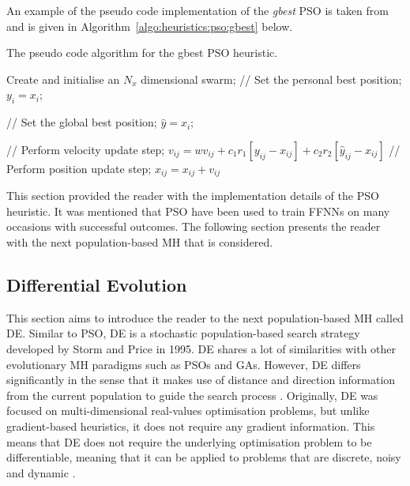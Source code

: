 An example of the pseudo code implementation of the \textit{gbest} \ac{PSO} is taken from \cite{ref:engelbrecht:2007} and is given in Algorithm~\ref{algo:heuristics:pso:gbest} below.

\begin{algorithm}[H]
      \caption{The pseudo code algorithm for the gbest \ac{PSO} heuristic.}
      \label{algo:heuristics:pso:gbest}
      \begin{algorithmic}
            \State Create and initialise an $N_{x}$ dimensional swarm;
            \State // Set the personal best position;
            \State $y_{i} = x_{i}$;
            \EndIf

            \State // Set the global best position;
            \State $\hat{y} = x_{i}$;
            \EndIf
            \EndFor

            \State // Perform velocity update step;
            \State $v_{ij} = wv_{ij} + c_{1}r_{1}[y_{ij} - x_{ij}] + c_{2}r_{2}[\hat{y}_{ij} - x_{ij}]$
            \State // Perform position update step;
            \State $x_{ij} = x_{ij} + v_{ij}$
            \EndFor
            \EndWhile
      \end{algorithmic}
\end{algorithm}

This section provided the reader with the implementation details of the \ac{PSO} heuristic. It was mentioned that \ac{PSO} have been used to train \acp{FFNN} on many occasions with successful outcomes. The following section presents the reader with the next population-based \ac{MH} that is considered.

\subsection{Differential Evolution}
\label{sec:heuristics:mh:de}

This section aims to introduce the reader to the next population-based \ac{MH} called \acl{DE}. Similar to \ac{PSO}, \Ac{DE} is a stochastic population-based search strategy developed by Storm and Price \cite{ref:price:2006} in 1995. \Ac{DE} shares a lot of similarities with other evolutionary \ac{MH} paradigms such as \acp{PSO} and \acp{GA}. However, \ac{DE} differs significantly in the sense that it makes use of distance and direction information from the current population to guide the search process \cite{ref:engelbrecht:2007}. Originally, \ac{DE} was focused on multi-dimensional real-values optimisation problems, but unlike gradient-based heuristics, it does not require any gradient information. This means that \ac{DE} does not require the underlying optimisation problem to be differentiable, meaning that it can be applied to problems that are discrete, noisy and dynamic \cite{ref:rocca:2011}.

